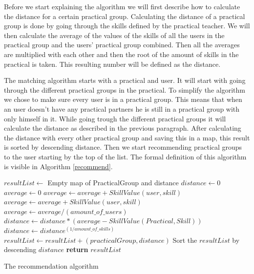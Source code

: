 Before we start explaining the algorithm we will first describe how to calculate the distance for a certain practical group.
Calculating the distance of a practical group is done by going through the skills defined by the practical teacher.
We will then calculate the average of the values of the skills of all the users in the practical group and the users' practical group combined.
Then all the averages are multiplied with each other and then the root of the amount of skills in the practical is taken.
This resulting number will be defined as the distance.

The matching algorithm starts with a practical and user.
It will start with going through the different practical groups in the practical.
To simplify the algorithm we chose to make sure every user is in a practical group.
This means that when an user doesn't have any practical partners he is still in a practical group with only himself in it.
While going trough the different practical groups it will calculate the distance as described in the previous paragraph.
After calculating the distance with every other practical group and saving this in a map, this result is sorted by descending distance.
Then we start recommending practical groups to the user starting by the top of the list.
The formal definition of this algorithm is visible in Algorithm \ref{recommend}.

\begin{algorithm}
\begin{algorithmic}
	\State $resultList\gets$ Empty map of PracticalGroup and distance
		\State $distance\gets 0$
			\State $average\gets 0$
				\State $average\gets average + SkillValue(user, skill)$
			\EndFor
				\State $average\gets average + SkillValue(user, skill)$
			\EndFor
			\State $average\gets average / (amount\_of\_users)$
			\State $distance\gets distance * (average - SkillValue(Practical, Skill))$
		\EndFor
		\State $distance\gets distance ^ {(1 / amount\_of\_skills)}$
		\State $resultList\gets resultList + (practicalGroup, distance)$
	\EndFor
	\State Sort the $resultList$ by descending $distance$
	\State \textbf{return} $resultList$
\EndFunction
\caption{The recommendation algorithm}\label{recommend}
\end{algorithmic}
\end{algorithm}


